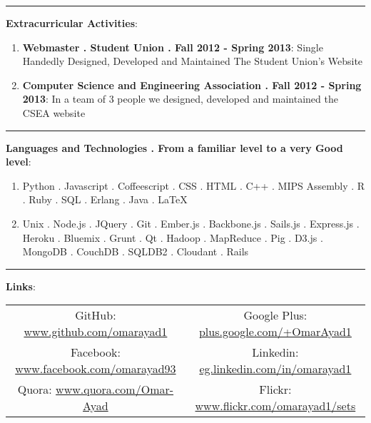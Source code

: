 \documentclass[24pt]{article}
\begin{document}
\noindent\rule{18cm}{0.4pt}



{\large \textbf{Extracurricular Activities}}:
\begin{enumerate}
	\item \textbf{Webmaster . Student Union . Fall 2012 - Spring 2013}: Single Handedly Designed, Developed and Maintained The Student Union's Website
	\item \textbf{Computer Science and Engineering Association . Fall 2012 - Spring 2013}: In a team of 3 people we designed, developed and maintained the CSEA website
\end{enumerate}

\noindent\rule{18cm}{0.4pt}

{\large \textbf{Languages and Technologies . From a familiar level to a very Good level}}:
\begin{enumerate}
	\item Python . Javascript . Coffeescript . CSS . HTML . C++ . MIPS Assembly . R . Ruby . SQL . Erlang . Java . {\large \LaTeX}
	\item Unix . Node.js . JQuery . Git . Ember.js . Backbone.js . Sails.js . Express.js . Heroku . Bluemix . Grunt . Qt . Hadoop . MapReduce . Pig . D3.js . MongoDB . CouchDB . SQLDB2 . Cloudant . Rails
\end{enumerate}

\noindent\rule{18cm}{0.4pt}


{\large \textbf{Links}}:
\begin{center}
\begin{tabu}{cc}
GitHub: \url{www.github.com/omarayad1}      & Google Plus: \url{plus.google.com/+OmarAyad1} \\
Facebook: \url{www.facebook.com/omarayad93} & Linkedin: \url{eg.linkedin.com/in/omarayad1}  \\
Quora: \url{www.quora.com/Omar-Ayad}        & Flickr: \url{www.flickr.com/omarayad1/sets}  
\end{tabu}
\end{center}
\end{document}

